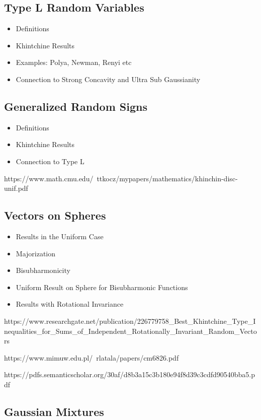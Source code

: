 \documentclass[10pt]{article}
\newcommand{\1}{\textbf{1}}
\theoremstyle{remark}
\theoremstyle{definition}
\begin{document}
\subsection{Type L Random Variables}
	
\begin{itemize}
	\item Definitions
	\item Khintchine Results
	\item Examples: Polya, Newman, Renyi etc
	\item Connection to Strong Concavity and Ultra Sub Gaussianity
\end{itemize}

\subsection{Generalized Random Signs}

\begin{itemize}
	\item Definitions
	\item Khintchine Results
	\item Connection to Type L
\end{itemize}

https://www.math.cmu.edu/~ttkocz/mypapers/mathematics/khinchin-disc-unif.pdf

\subsection{Vectors on Spheres}

\begin{itemize}
	\item Results in the Uniform Case
	\item Majorization
	\item Bisubharmonicity
	\item Uniform Result on Sphere for Bisubharmonic Functions
	\item Results with Rotational Invariance
\end{itemize}

https://www.researchgate.net/publication/226779758_Best_Khintchine_Type_Inequalities_for_Sums_of_Independent_Rotationally_Invariant_Random_Vectors

https://www.mimuw.edu.pl/~rlatala/papers/cm6826.pdf

https://pdfs.semanticscholar.org/30af/d8b3a15c3b180e94f8d39c3cdfd90540bba5.pdf

\subsection{Gaussian Mixtures}
\end{document}
